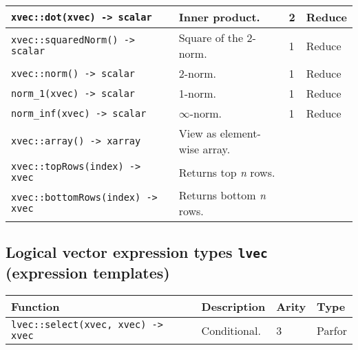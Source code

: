 \documentclass{article}
\begin{document}
\begin{tabular}{|p{7.2cm}|p{5.8cm}|p{0.95cm}|p{1.15cm}|}
\lstinline|xvec::dot(xvec) -> scalar| & Inner product. & 2 & Reduce \\\hline
\lstinline|xvec::squaredNorm() -> scalar| & Square of the 2-norm. & 1 & Reduce \\\hline
\lstinline|xvec::norm() -> scalar| & 2-norm. & 1 & Reduce \\\hline
\lstinline|norm_1(xvec) -> scalar| & 1-norm. & 1 & Reduce \\\hline
\lstinline|norm_inf(xvec) -> scalar| & $\infty$-norm. & 1 & Reduce \\\hline
\lstinline|xvec::array() -> xarray| & View as element-wise array. & & \\\hline
\lstinline|xvec::topRows(index) -> xvec| & Returns top \textit{n} rows. & & \\\hline
\lstinline|xvec::bottomRows(index) -> xvec| & Returns bottom \textit{n} rows. & & \\\hline
\end{tabular}

\subsection*{Logical vector expression types \texttt{lvec} (expression templates)}
\begin{tabular}{|p{7.2cm}|p{5.8cm}|p{0.95cm}|p{1.15cm}|}
\hline
\textbf{Function} & \textbf{Description} & \textbf{Arity} & \textbf{Type}\\\hline
\lstinline|lvec::select(xvec, xvec) -> xvec| & Conditional. & 3 & Parfor \\\hline
\end{tabular}
\end{document}
